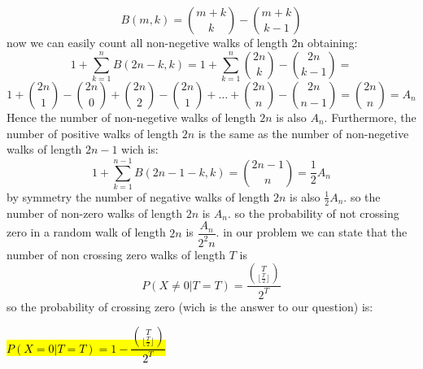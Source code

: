 \begin{qsolve}
\begin{qsolve}[]
		$$B(m,k) = \binom{m + k}{k} - \binom{m + k}{k-1} $$
		now we can easily count all non-negetive walks of length 2n obtaining:
		$$1 + \sum _{k=1}^{n} B(2n-k,k) = 1 +  \sum _{k=1}^{n} \binom{2n}{k} - \binom{2n}{k-1} =$$
		$$ 1 + \binom{2n}{1} - \binom{2n}{0} + \binom{2n}{2} - \binom{2n}{1} + \dots + \binom{2n}{n} - \binom{2n}{n-1} = \binom{2n}{n} = A_n$$
		Hence the number of non-negetive walks of length $2n$ is also $A_n$. Furthermore, the number of positive walks of length $2n$ is the same as the number of non-negetive walks of length $2n-1$ wich is:
		$$1 + \sum _{k=1}^{n-1} B(2n-1-k,k) = \binom{2n-1}{n} = \frac{1}{2} A_n$$
		by symmetry the number of negative walks of length $2n$ is also $\frac{1}{2} A_n$. so the number of non-zero walks of length $2n$ is $A_n$. so the probability of not crossing zero in a random walk of length $2n$ is $\dfrac{A_n}{2^2n}$. in our problem we can state that the number of non crossing zero walks of length $T$ is $$P(X\neq 0|T=T) = \dfrac{\binom{T}{\lfloor \frac{T}{2} \rfloor}}{2^T}$$
		so the probability of crossing zero (wich is the answer to our question) is:
		\begin{center}
			\hl{$P(X=0|T=T) = 1 - \dfrac{\binom{T}{\lfloor \frac{T}{2} \rfloor}}{2^T}$}
		\end{center}
	\end{qsolve}

\end{qsolve}


